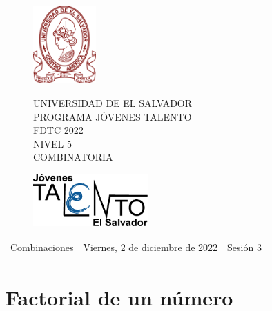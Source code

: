 \documentclass[12pt]{article}
\newcommand{\tema}{Combinaciones}
\newcommand{\fecha}{Viernes, 2 de diciembre de 2022}
\newcommand{\sesion}{Sesión 3}
\begin{document}
\thispagestyle{empty}

\begin{figure}[h] 
	\begin{minipage}[b]{0.26\textwidth}
		\begin{center}
			\includegraphics[height=3cm]{Logos/UES.png}
			\par\end{center}
	\end{minipage} 
	\begin{minipage}[b]{0.46\textwidth}
		\begin{center}
			UNIVERSIDAD DE EL SALVADOR\\ [0.1cm]
			PROGRAMA JÓVENES TALENTO\\ [0.1cm]
	        FDTC 2022\\ [0.1cm]
                NIVEL 5\\ [0.1cm]
			COMBINATORIA 
			\par\end{center}
	\end{minipage} 
	\begin{minipage}[b]{0.05\textwidth}
		\begin{center}
			\includegraphics[height=2cm]{Logos/LOGO PJT.png}
			\par\end{center}
	\end{minipage}
\end{figure}

\begin{center}
    \begin{tabular}{p{4.5cm} p{7cm} p{4.5cm}}
        \tema & \centering\fecha & \hfill\sesion
    \end{tabular}
\end{center}

\section{Factorial de un número}
\end{document}
